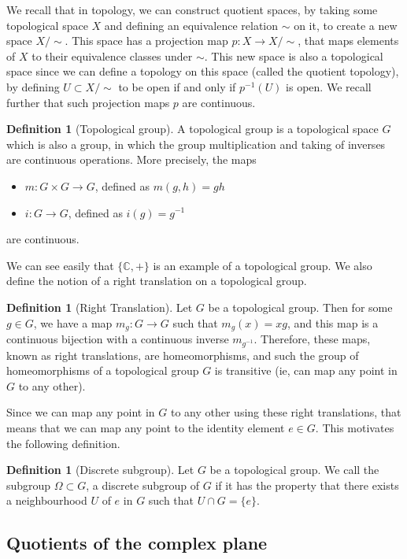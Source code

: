 \documentclass[11pt]{report}
\theoremstyle{definition}
\newtheorem{defn}[thm]{Definition}
\begin{document}
We recall that in topology, we can construct quotient spaces, by taking some topological space $X$ and defining an equivalence relation $\sim$ on it, to create a new space $X/\sim$. This space has a projection map $p \colon X \rightarrow X/\sim$, that maps elements of $X$ to their equivalence classes under $\sim$. This new space is also a topological space since we can define a topology on this space (called the quotient topology), by defining $U \subset X/\sim$ to be open if and only if $p^{-1}(U)$ is open. We recall further that such projection maps $p$ are continuous. 
\begin{defn}[Topological group]
  A topological group is a topological space $G$ which is also a group, in which the group multiplication and taking of inverses are continuous operations. More precisely, the maps 
  \begin{itemize}
    \item $m:G \times G \rightarrow G$, defined as $m(g,h)=gh$
    \item $i:G \rightarrow G$, defined as $i(g)=g^{-1}$
  \end{itemize}
  are continuous.
\end{defn}
We can see easily that $\{\mathbb{C}, + \}$ is an example of a topological group. We also define the notion of a right translation on a topological group.
\begin{defn}[Right Translation]
  Let $G$ be a topological group. Then for some $g \in G$, we have a map $m_g:G \rightarrow G$ such that $m_g(x) = xg$, and this map is a continuous bijection with a continuous inverse $m_{g^{-1}}$. Therefore, these maps, known as right translations, are homeomorphisms, and such the group of homeomorphisms of a topological group $G$ is transitive (ie, can map any point in $G$ to any other).
\end{defn}
Since we can map any point in $G$ to any other using these right translations, that means that we can map any point to the identity element $e \in G$. This motivates the following definition.
\begin{defn}[Discrete subgroup]
  Let $G$ be a topological group. We call the subgroup $\Omega \subset G$, a discrete subgroup of $G$ if it has the property that there exists a neighbourhood $U$ of $e$ in $G$ such that $U \cap G = \{e\}$.
\end{defn}
\subsection{Quotients of the complex plane}
\end{document}
